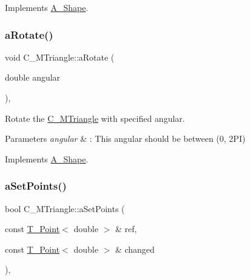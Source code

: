 Implements \hyperlink{classA__Shape_a892688cbbad3297e00e87cce0dbfc76d}{A\+\_\+\+Shape}.

\mbox{\label{classC__MTriangle_a33aa36879be70b0a11863801da56e92e}} 
\subsubsection{\texorpdfstring{a\+Rotate()}{aRotate()}}
{\footnotesize\ttfamily void C\+\_\+\+M\+Triangle\+::a\+Rotate (\begin{DoxyParamCaption}\item[{double}]{angular }\end{DoxyParamCaption})\hspace{0.3cm}{\ttfamily [override]}, {\ttfamily [virtual]}}



Rotate the \hyperlink{classC__MTriangle}{C\+\_\+\+M\+Triangle} with specified angular. 


\begin{DoxyParams}{Parameters}
{\em angular} & \+: This angular should be between (0, 2\+PI) \\
\hline
\end{DoxyParams}


Implements \hyperlink{classA__Shape_a25b4e0c34cdb46da5382fe9c7467efaf}{A\+\_\+\+Shape}.

\mbox{\label{classC__MTriangle_a5a3971eb0aafc16e5a34bd94130d7c6b}} 
\subsubsection{\texorpdfstring{a\+Set\+Points()}{aSetPoints()}}
{\footnotesize\ttfamily bool C\+\_\+\+M\+Triangle\+::a\+Set\+Points (\begin{DoxyParamCaption}\item[{const \hyperlink{classT__Point}{T\+\_\+\+Point}$<$ double $>$ \&}]{ref,  }\item[{const \hyperlink{classT__Point}{T\+\_\+\+Point}$<$ double $>$ \&}]{changed }\end{DoxyParamCaption})\hspace{0.3cm}{\ttfamily [override]}, {\ttfamily [virtual]}}



